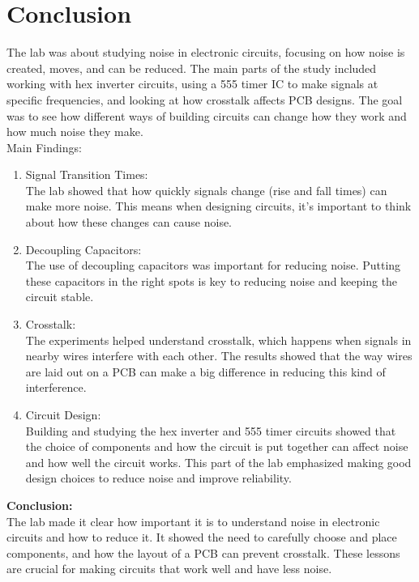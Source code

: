\documentclass[a4paper,11pt]{article}%
\begin{document}
\section{Conclusion}

The lab was about studying noise in electronic circuits, focusing on how noise is created, moves, and can be reduced. The main parts of the study included working with hex inverter circuits, using a 555 timer IC to make signals at specific frequencies, and looking at how crosstalk affects PCB designs. The goal was to see how different ways of building circuits can change how they work and how much noise they make.\\

Main Findings:\\
\begin{enumerate}
	\item Signal Transition Times:\\ The lab showed that how quickly signals change (rise and fall times) can make more noise. This means when designing circuits, it's important to think about how these changes can cause noise.
	\item Decoupling Capacitors:\\ The use of decoupling capacitors was important for reducing noise. Putting these capacitors in the right spots is key to reducing noise and keeping the circuit stable.
	\item Crosstalk:\\ The experiments helped understand crosstalk, which happens when signals in nearby wires interfere with each other. The results showed that the way wires are laid out on a PCB can make a big difference in reducing this kind of interference.
	\item Circuit Design:\\ Building and studying the hex inverter and 555 timer circuits showed that the choice of components and how the circuit is put together can affect noise and how well the circuit works. This part of the lab emphasized making good design choices to reduce noise and improve reliability.
\end{enumerate}

\textbf{Conclusion:}\\

The lab made it clear how important it is to understand noise in electronic circuits and how to reduce it. It showed the need to carefully choose and place components, and how the layout of a PCB can prevent crosstalk. These lessons are crucial for making circuits that work well and have less noise.
\end{document}
